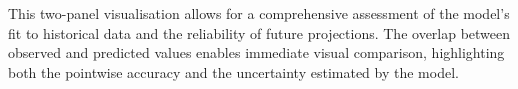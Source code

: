 \documentclass{Configuration_Files/PoliMi3i_thesis}
\begin{document}
This two-panel visualisation allows for a comprehensive assessment of the model's fit to historical data and the reliability of future projections. The overlap between observed and predicted values enables immediate visual comparison, highlighting both the pointwise accuracy and the uncertainty estimated by the model.





\end{document}
